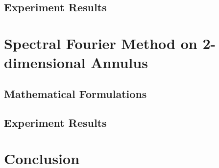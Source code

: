 \documentclass[11pt, notitlepage,  letterpaper]{article}
\begin{document}
\subsection{Experiment Results}



\clearpage
\section{Spectral Fourier Method on 2-dimensional Annulus}

\subsection{Mathematical Formulations}


\subsection{Experiment Results}



\clearpage
\section{Conclusion}





\end{document}
